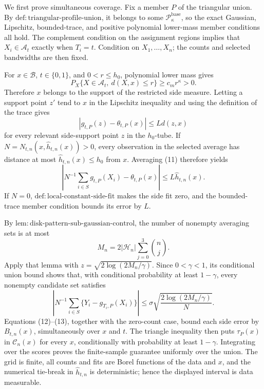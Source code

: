 We first prove simultaneous coverage.  Fix a member \(P\) of the triangular union.  By \(\mathrm{def:triangular\text{-}profile\text{-}union}\), it belongs to some \(\mathcal P_\kappa^{\mathrm{base}}\), so the exact Gaussian, Lipschitz, bounded-trace, and positive polynomial lower-mass member conditions all hold.  The complement condition on the assignment regions implies that \(X_i\in\mathcal A_t\) exactly when \(T_i=t\).  Condition on \(X_1,\ldots,X_n\); the counts and selected bandwidths are then fixed.

For \(x\in\mathcal B\), \(t\in\{0,1\}\), and \(0<r\le h_0\), polynomial lower mass gives
\[
 P_X\{X\in\mathcal A_t,\ d(X,x)\le r\}\ge c_mr^\kappa>0. \tag{10}
\]
Therefore \(x\) belongs to the support of the restricted side measure.  Letting a support point \(z'\) tend to \(x\) in the Lipschitz inequality and using the definition of the trace gives
\[
 |g_{t,P}(z)-\theta_{t,P}(x)|\le Ld(z,x) \tag{11}
\]
for every relevant side-support point \(z\) in the \(h_0\)-tube.  If \(N=N_{t,n}(x,\widehat h_{t,n}(x))>0\), every observation in the selected average has distance at most \(\widehat h_{t,n}(x)\le h_0\) from \(x\).  Averaging (11) therefore yields
\[
 \left|N^{-1}\sum_{i\in S}g_{t,P}(X_i)-\theta_{t,P}(x)\right|
 \le L\widehat h_{t,n}(x). \tag{12}
\]
If \(N=0\), \(\mathrm{def:local\text{-}constant\text{-}side\text{-}fit}\) makes the side fit zero, and the bounded-trace member condition bounds its error by \(L\).

By \(\mathrm{lem:disk\text{-}pattern\text{-}sub\text{-}gaussian\text{-}control}\), the number of nonempty averaging sets is at most
\[
 M_n=2|\mathcal H_n|\sum_{j=0}^3\binom nj.
\]
Apply that lemma with \(z=\sqrt{2\log(2M_n/\gamma)}\).  Since \(0<\gamma<1\), its conditional union bound shows that, with conditional probability at least \(1-\gamma\), every nonempty candidate set satisfies
\[
 \left|N^{-1}\sum_{i\in S}\{Y_i-g_{T_i,P}(X_i)\}\right|
 \le\sigma\sqrt{\frac{2\log(2M_n/\gamma)}N}. \tag{13}
\]
Equations (12)--(13), together with the zero-count case, bound each side error by \(B_{t,n}(x)\), simultaneously over \(x\) and \(t\).  The triangle inequality then puts \(\tau_P(x)\) in \(\mathcal C_n(x)\) for every \(x\), conditionally with probability at least \(1-\gamma\).  Integrating over the scores proves the finite-sample guarantee uniformly over the union.  The grid is finite, all counts and fits are Borel functions of the data and \(x\), and the numerical tie-break in \(\widehat h_{t,n}\) is deterministic; hence the displayed interval is data measurable.

